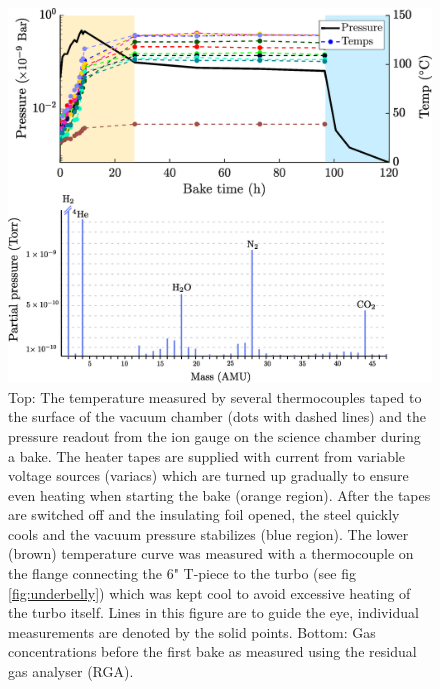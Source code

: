 	\begin{figure}
		\includegraphics[width=\textwidth]{fig/lattice/RGA_pre_post_bake_nice}
		\caption{Top: The temperature measured by several thermocouples taped to the surface of the vacuum chamber (dots with dashed lines) and the pressure readout from the ion gauge on the science chamber during a bake.
		The heater tapes are supplied with current from variable voltage sources (variacs) which are turned up gradually to ensure even heating when starting the bake (orange region).
		After the tapes are switched off and the insulating foil opened, the steel quickly cools and the vacuum pressure stabilizes (blue region).
		The lower (brown) temperature curve was measured with a thermocouple on the flange connecting the 6" T-piece to the turbo (see fig \ref{fig:underbelly}) which was kept cool to avoid excessive heating of the turbo itself. 
		Lines in this figure are to guide the eye, individual measurements are denoted by the solid points.
		Bottom:
		Gas concentrations before the first bake as measured using the residual gas analyser (RGA). 		}
		\label{fig:bakeouts}
		\end{figure}
			
